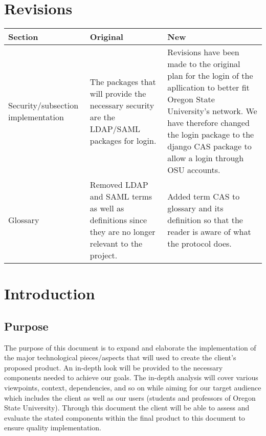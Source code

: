 \documentclass[onecolumn, draftclsnofoot,10pt, compsoc]{IEEEtran}
\begin{document}
\begin{titlepage}
\begin{singlespace}
\begin{abstract}
        \end{abstract}     
    \end{singlespace}
\end{titlepage}
\newpage
{}
\tableofcontents
\clearpage

\section*{Revisions}

\begin{tabu} to 
        \hline
        \textbf{Section} & \textbf{Original} & \textbf{New}\\
        \hline
        Security/subsection implementation & The packages that will provide the necessary security are the LDAP/SAML packages for login. & Revisions have been made to the original plan for the login of the apllication to better fit Oregon State University's network. We have therefore changed the login package to the django CAS package to allow a login through OSU accounts. \\
        \hline
        Glossary & Removed LDAP and SAML terms as well as definitions since they are no longer relevant to the project. & Added term CAS to glossary and its definition so that the reader is aware of what the protocol does.\\ 
        \hline
        
\end{tabu}

\section{Introduction}
\subsection{Purpose}
The purpose of this document is to expand and elaborate the implementation of the major technological pieces/aspects that will used to create the client’s proposed product.  An in-depth look will be provided to the necessary components needed to achieve our goals. The in-depth analysis will cover various viewpoints, context, dependencies, and so on while aiming for our target audience which includes the client as well as our users (students and professors of Oregon State University). Through this document the client will be able to assess and evaluate the stated components within the final product to this document to ensure quality implementation.
\end{document}
